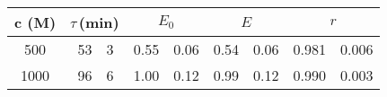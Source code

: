 \begin{tabular}{cr@{$\,\pm\,$}lr@{$\,\pm\,$}lr@{$\,\pm\,$}lr@{$\,\pm\,$}l}
\toprule
c (\g{m}M)
   & \multicolumn{2}{c}{$\tau$\,(min)}
                & \multicolumn{2}{c}{$E_0$}
                               & \multicolumn{2}{c}{$E$}
                                              & \multicolumn{2}{c}{$r$} \\
\midrule

 500 &   53 & 3 &  0.55 & 0.06 &  0.54 & 0.06 &  0.981 & 0.006 \\
1000 &   96 & 6 &  1.00 & 0.12 &  0.99 & 0.12 &  0.990 & 0.003 \\
\bottomrule
\end{tabular}
